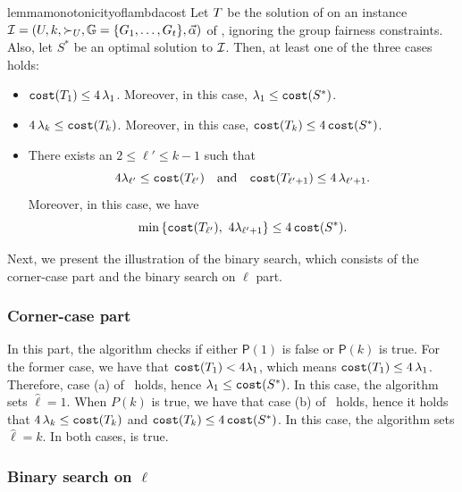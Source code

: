 \begin{restatable}{lemma}{monotonicityoflambdacost}
    \label{lemma:monotonicity-of-lambda-and-cost-init-sol-set}
    Let $T$ be the solution of \bcfrss on an instance $\mathcal{I}=(U,k, \succ_U, \mathbb{G}=\{G_1,\dots,G_t\},\vec{\alpha})$ of \ordfairkcen, ignoring the group fairness constraints. Also, let $S^*$ be an optimal solution to $\mathcal{I}$. 
    Then, at least one of the three cases  holds:
\begin{itemize}
    \item[\textbf{(a)}] $\texttt{cost}(T_{1}) \leq 4\,\lambda_{1}$. Moreover, in this case, $\lambda_{1} \leq \texttt{cost}(S^*)$. 
    \item[\textbf{(b)}] $4\,\lambda_{k} \leq \texttt{cost}(T_{k})$. Moreover, in this case, $\texttt{cost}(T_{k}) \leq 4\,\texttt{cost}(S^*)$. 
    \item[\textbf{(c)}] There exists an $2 \leq \ell' \leq k-1$ such that
    \[
        4\lambda_{\ell'} \leq \texttt{cost}(T_{\ell'})
        \quad \text{and} \quad
        \texttt{cost}(T_{\ell'+1}) \leq 4\, \lambda_{\ell'+1}.
    \]
    Moreover, in this case, we have
    \[
        \min \left\{ \texttt{cost}(T_{\ell'}),~ 4\lambda_{\ell'+1} \right\} \leq 4\,\texttt{cost}(S^*).
    \]
\end{itemize}
\end{restatable}

Next, we present the illustration of the binary search, which consists of the corner-case part and the binary search on $\ell$ part. 

\subsubsection{Corner-case part}\label{sec:basecase}
In this part, the algorithm checks if either $\mathsf{P}(1)$ is false or $\mathsf{P}(k)$ is true.
For the former case, we have that $\texttt{cost}(T_{1}) < 4 \lambda_1$, which means $\texttt{cost}(T_{1}) \leq 4\,\lambda_{1}$. Therefore,  case (a) of~  holds,  hence $\lambda_1 \leq \texttt{cost}(S^*)$.
In this case, the algorithm sets $\hat{\ell}=1$.
    When $P(k)$ is true, we have that case (b) of~ holds, hence it holds that $4\,\lambda_{k} \leq \texttt{cost}(T_{k})$ and $\texttt{cost}(T_{k}) \leq 4\,\texttt{cost}(S^*)$.   In this case, the algorithm sets $\hat{\ell}=k$. In both cases,  is true.

\subsubsection{Binary search on $\ell$}
\label{sec:binary-search-on-ell}

